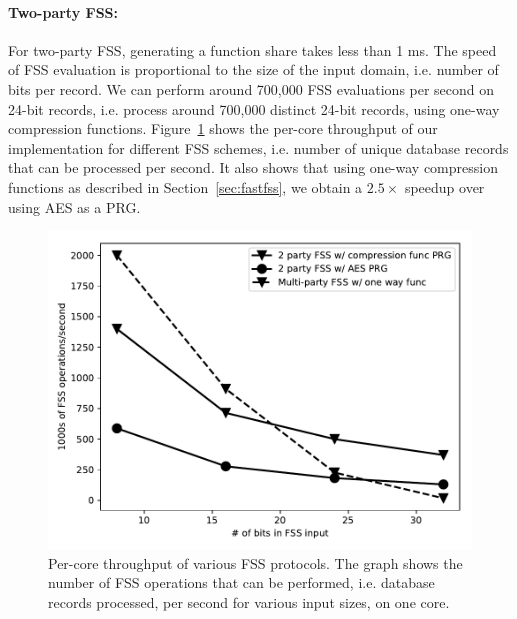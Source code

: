 \paragraph{Two-party FSS:}
For two-party FSS, generating a function share takes less than 1 ms.
The speed of FSS evaluation is proportional to the size of the input domain, i.e. number of bits per record. 
We can perform around 700,000 FSS evaluations per second on
24-bit records, i.e. process around 700,000
distinct 24-bit records, using one-way compression functions.
Figure~\ref{fig:micro2} shows the per-core throughput of our implementation
for different FSS schemes, i.e. number of unique database records that can be processed
per second. It also shows that using one-way compression functions
as described in Section~\ref{sec:fastfss}, we obtain a $2.5\times$ speedup over using 
AES as a PRG.

\begin{figure}
	\centering
	\includegraphics[width=\textwidth]{splinter-figs/micro.pdf}
	\caption[Per-core throughput of various FSS protocols.]{Per-core throughput of various FSS protocols. 
		The graph shows the number of FSS operations that can be performed, i.e. database records processed, per second for various input sizes, on one core.}
	\label{fig:micro2}
\end{figure}


